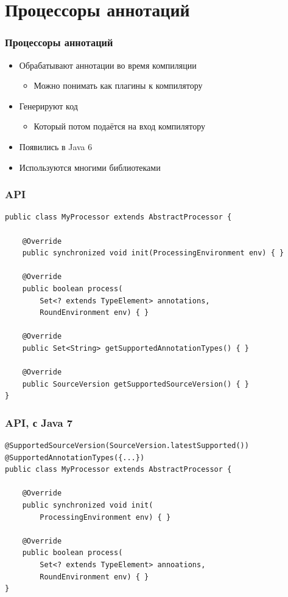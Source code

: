 \documentclass[xetex,mathserif,serif]{beamer}
\begin{document}
	\section{Процессоры аннотаций}

	\begin{frame}
		\frametitle{Процессоры аннотаций}
		\begin{itemize}
			\item Обрабатывают аннотации во время компиляции
			\begin{itemize}
				\item Можно понимать как плагины к компилятору
			\end{itemize}
			\item Генерируют код
			\begin{itemize}
				\item Который потом подаётся на вход компилятору
			\end{itemize}
			\item Появились в Java 6
			\item Используются многими библиотеками
		\end{itemize}
	\end{frame}

	\begin{frame}[fragile]
		\frametitle{API}
		\begin{small}
			\begin{verbatim}
public class MyProcessor extends AbstractProcessor {

    @Override
    public synchronized void init(ProcessingEnvironment env) { }

    @Override
    public boolean process(
        Set<? extends TypeElement> annotations, 
        RoundEnvironment env) { }

    @Override
    public Set<String> getSupportedAnnotationTypes() { }

    @Override
    public SourceVersion getSupportedSourceVersion() { }
}
			\end{verbatim}
		\end{small}
	\end{frame}

	\begin{frame}[fragile]
		\frametitle{API, с Java 7}
		\begin{small}
			\begin{verbatim}
@SupportedSourceVersion(SourceVersion.latestSupported())
@SupportedAnnotationTypes({...})
public class MyProcessor extends AbstractProcessor {

    @Override
    public synchronized void init(
        ProcessingEnvironment env) { }

    @Override
    public boolean process(
        Set<? extends TypeElement> annoations, 
        RoundEnvironment env) { }
}
			\end{verbatim}
		\end{small}
	\end{frame}
\end{document}
